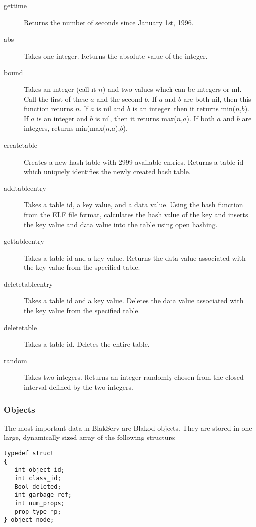 \begin{description}
\item[gettime] Returns the number of seconds since January 1st, 1996.

\item[abs] Takes one integer.  Returns the absolute value of the integer.

\item[bound] Takes an integer (call it $n$) and two values which can be integers or nil.  
Call the first of these $a$ and the second $b$.  If $a$ and $b$ are both nil, then this
function returns $n$.  If $a$ is nil and $b$ is an integer, then it returns min($n$,$b$).
If $a$ is an integer and $b$ is nil, then it returns max($n$,$a$).  If both $a$ and $b$
are integers, returns min(max($n$,$a$),$b$).

\item[createtable] Creates a new hash table with 2999 available entries.  Returns a table
id which uniquely identifies the newly created hash table.

\item[addtableentry] Takes a table id, a key value, and a data value.  Using the
hash function from the ELF file format, calculates the hash value of the key and
inserts the key value and data value into the table using open hashing.

\item[gettableentry] Takes a table id and a key value.  Returns the data value
associated with the key value from the specified table.

\item[deletetableentry] Takes a table id and a key value.  Deletes the data value
associated with the key value from the specified table.

\item[deletetable] Takes a table id.  Deletes the entire table.
   
\item[random] Takes two integers.  Returns an integer randomly chosen from the closed
interval defined by the two integers.

\end{description}

\subsubsection{Objects}

The most important data in BlakServ are Blakod objects.  They are stored in one large,
dynamically sized array of the following structure:
\begin{verbatim}
typedef struct
{
   int object_id;
   int class_id;
   Bool deleted;
   int garbage_ref;
   int num_props;
   prop_type *p;
} object_node;
\end{verbatim}

